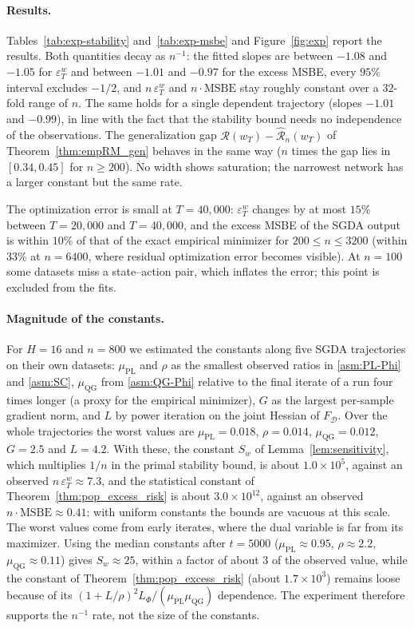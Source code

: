 \paragraph{Results.}
Tables~\ref{tab:exp-stability} and~\ref{tab:exp-msbe} and Figure~\ref{fig:exp} report the results. Both
quantities decay as $n^{-1}$: the fitted slopes are between $-1.08$ and $-1.05$ for
$\varepsilon^w_T$ and between $-1.01$ and $-0.97$ for the excess MSBE, every $95\%$ interval
excludes $-1/2$, and $n\,\varepsilon^w_T$ and $n\cdot\mathrm{MSBE}$ stay roughly constant over a $32$-fold
range of $n$. The same holds for a single dependent trajectory (slopes
$-1.01$ and $-0.99$), in line with the fact that
the stability bound needs no independence of the observations. The generalization gap
$\mathcal R(w_T)-\widehat{\mathcal R}_n(w_T)$ of Theorem~\ref{thm:empRM_gen} behaves in the same way
($n$ times the gap lies in $[0.34,0.45]$ for $n\ge200$). No width shows saturation; the
narrowest network has a larger constant but the same rate.

The optimization error is small at $T=40{,}000$: $\varepsilon^w_T$ changes by at most
$15\%$ between $T=20{,}000$ and $T=40{,}000$, and the excess MSBE of
the SGDA output is within $10\%$ of that of the exact empirical minimizer for
$200\le n\le3200$ (within $33\%$ at $n=6400$, where residual optimization error
becomes visible). At $n=100$ some datasets miss a state--action pair, which inflates the error; this point
is excluded from the fits.

\paragraph{Magnitude of the constants.}
For $H=16$ and $n=800$ we estimated the constants along five SGDA trajectories on their own datasets:
$\mu_{\mathrm{PL}}$ and $\rho$ as the smallest observed ratios in \ref{asm:PL-Phi} and \ref{asm:SC},
$\mu_{\mathrm{QG}}$ from \ref{asm:QG-Phi} relative to the final iterate of a run four times longer
(a proxy for the empirical minimizer), $G$ as the largest per-sample gradient norm, and $L$ by power
iteration on the joint Hessian of $F_{\mathcal D}$. Over the whole trajectories the worst values are
$\mu_{\mathrm{PL}}=0.018$, $\rho=0.014$, $\mu_{\mathrm{QG}}=0.012$,
$G=2.5$ and $L=4.2$. With these, the constant $S_w$ of Lemma~\ref{lem:sensitivity}, which multiplies $1/n$
in the primal stability bound, is about $1.0\times10^{5}$, against an observed $n\,\varepsilon^w_T\approx7.3$, and the
statistical constant of Theorem~\ref{thm:pop_excess_risk} is about $3.0\times10^{12}$, against an
observed $n\cdot\mathrm{MSBE}\approx0.41$: with uniform constants the bounds are vacuous at
this scale. The worst values come from early iterates, where the dual variable is far from its maximizer.
Using the median constants after $t=5000$ ($\mu_{\mathrm{PL}}\approx0.95$,
$\rho\approx2.2$, $\mu_{\mathrm{QG}}\approx0.11$) gives $S_w\approx25$,
within a factor of about $3$ of the observed value, while the constant of
Theorem~\ref{thm:pop_excess_risk} (about $1.7\times10^{3}$) remains loose because of its
$(1+L/\rho)^2L_\Phi/(\mu_{\mathrm{PL}}\mu_{\mathrm{QG}})$ dependence. The experiment therefore supports
the $n^{-1}$ rate, not the size of the constants.

